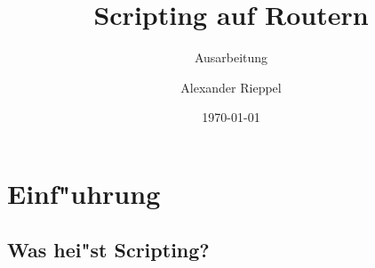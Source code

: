 \documentclass[a4paper,12pt]{scrreprt}
\begin{document}
\author{Alexander Rieppel} %
\title{Scripting auf Routern} %
\subject{NWSY} %
\subtitle{Ausarbeitung} %
\date{\today} %
\publishers{5AHITT} %

\maketitle
\tableofcontents


\chapter{Einf"uhrung}
\section{Was hei"st Scripting?}
\end{document}
